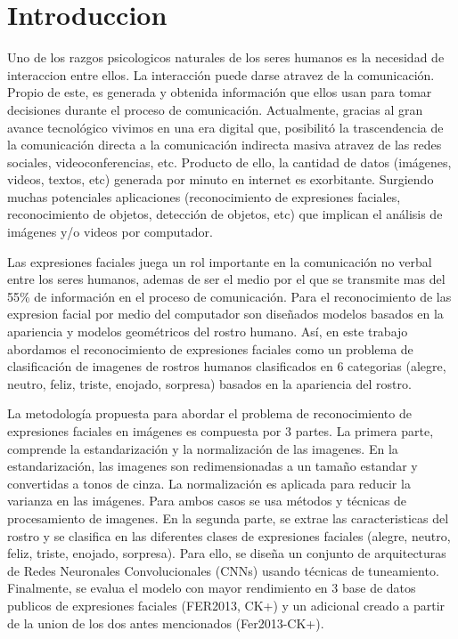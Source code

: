 \chapter*{Introduccion}
Uno de los razgos psicologicos naturales de los seres humanos es la necesidad de interaccion entre ellos. La interacción puede darse atravez de la comunicación. Propio de este, es generada y obtenida información que ellos usan para tomar decisiones durante el proceso de comunicación. Actualmente, gracias al gran avance tecnológico vivimos en una era digital que, posibilitó la trascendencia de la comunicación directa a la comunicación indirecta masiva atravez de las redes sociales, videoconferencias, etc. Producto de ello, la cantidad de datos (imágenes, videos, textos, etc) generada por minuto en internet es exorbitante. Surgiendo muchas potenciales aplicaciones (reconocimiento de expresiones faciales, reconocimiento de objetos, detección de objetos, etc) que implican el análisis de imágenes y/o videos por computador. 

Las expresiones faciales juega un rol importante en la comunicación no verbal entre los seres humanos, ademas de ser el medio por el que se transmite mas del 55\% de información en el proceso  de comunicación. Para el reconocimiento de las expresion facial por medio del computador son diseñados modelos basados en la apariencia y modelos geométricos del rostro humano.
Así, en este trabajo abordamos el reconocimiento de expresiones faciales como un problema de clasificación de imagenes de rostros humanos clasificados en 6 categorias (alegre, neutro, feliz, triste, enojado, sorpresa) basados en la apariencia del rostro.

La metodología propuesta  para abordar el problema de reconocimiento de expresiones faciales en imágenes es compuesta por 3 partes. La primera parte, comprende la estandarización y la normalización de las imagenes. En la estandarización, las imagenes son redimensionadas a un tamaño estandar y convertidas a tonos de cinza. La normalización es aplicada para reducir la varianza en las imágenes. Para ambos casos se usa métodos y técnicas de procesamiento de imagenes. En la segunda parte, se extrae las caracteristicas del rostro y se clasifica en las diferentes clases de expresiones faciales (alegre, neutro, feliz, triste, enojado, sorpresa). Para ello, se diseña un conjunto de arquitecturas de Redes Neuronales Convolucionales (CNNs) usando técnicas de tuneamiento. Finalmente, se evalua el modelo con mayor rendimiento en 3 base de datos publicos de expresiones faciales (FER2013, CK+) y un adicional creado a partir de la union de los dos antes mencionados (Fer2013-CK+). 


